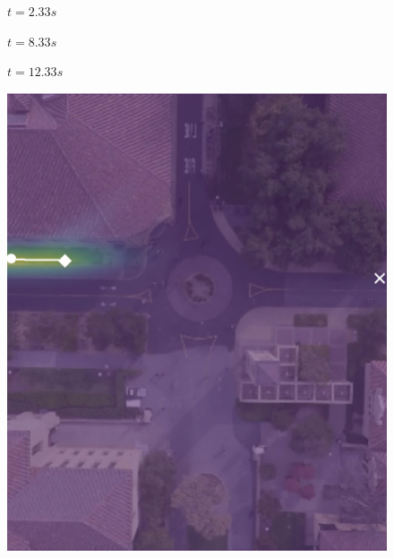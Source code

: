 \documentclass[letterpaper,10pt,conference]{ieeeconf}
\begin{document}
\begin{figure}
\hspace{.02\linewidth}
\begin{minipage}{0.3\linewidth}
\centering
$t = 2.33s$
\end{minipage}
\begin{minipage}{0.3\linewidth}
	\centering
	$t = 8.33s$
\end{minipage}
\begin{minipage}{0.3\linewidth}
	\centering
	$t = 12.33s$
\end{minipage}

	\label{fig:death-1-2}
\end{figure}

\begin{figure}
	\centering
	\begin{minipage}[t]{0.5cm}
	\end{minipage}
	\begin{minipage}[t]{0.3\linewidth}
		\includegraphics[width=\linewidth]{./figures/comparison/ours_death_1_2_t=70.png}
	\end{minipage}
	\begin{minipage}[t]{0.3\linewidth}

\end{minipage}
\end{figure}
\end{document}
